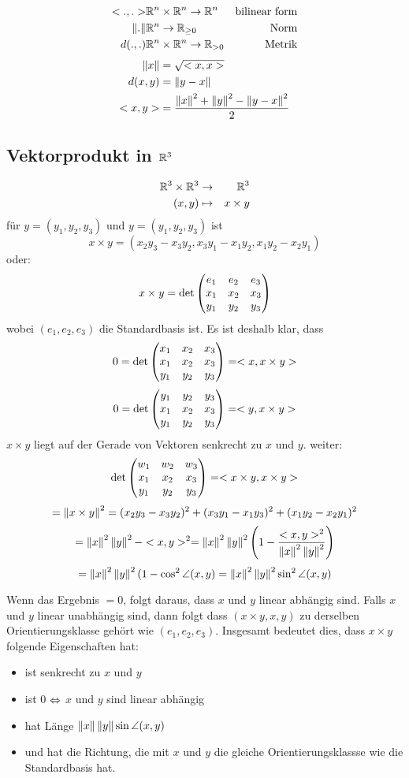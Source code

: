 \begin{Faz}
  \begin{align*}
    <.,.>& \mathbb{R}^n\times\mathbb{R}^n\to\mathbb{R}^n&\text{bilinear form}\\
    \left\| . \right\|& \mathbb{R}^n\to \mathbb{R}_{\geq 0}& \text{Norm}\\
    d(.,.)&\mathbb{R}^n\times\mathbb{R}^n\to\mathbb{R}_{>0}&\text{Metrik}
  \end{align*}
  \begin{align*}
    \left\| x \right\|&=\sqrt{<x,x>}\\
    d(x,y)&=\left\| y-x \right\|\\
    <x,y>&=\frac{\left\| x \right\|^2+\left\| y \right\|^2-\left\| y-x \right\|^2}{2}
  \end{align*}
\end{Faz}
\subsection{Vektorprodukt in $\mathbb{R}^3$}
  \begin{align*}
    \mathbb{R}^3\times\mathbb{R}^3&\to&\mathbb{R}^3\\
    (x,y)&\mapsto&x\times y
  \end{align*}
  für $y=(y_1,y_2,y_3)$ und $y=(y_1,y_2,y_3)$ ist 
  \[x\times y=(x_2y_3-x_3y_2, x_3y_1-x_1y_2,x_1y_2-x_2y_1)\]
  oder:
  \[x\times y=\det\begin{pmatrix}e_1&e_2&e_3\\x_1&x_2&x_3\\y_1&y_2&y_3\end{pmatrix}\]
  wobei $(e_1,e_2,e_3)$ die Standardbasis ist. Es ist deshalb klar, dass
  \[0=\det\begin{pmatrix}x_1&x_2&x_3\\x_1&x_2&x_3\\y_1&y_2&y_3\end{pmatrix}=<x,x\times y>\]
  \[0=\det\begin{pmatrix}y_1&y_2&y_3\\x_1&x_2&x_3\\y_1&y_2&y_3\end{pmatrix}=<y,x\times y>\]
  $x\times y$ liegt auf der Gerade von Vektoren senkrecht zu $x$ und $y$.
  weiter:
  \[\det\begin{pmatrix}w_1&w_2&w_3\\x_1&x_2&x_3\\y_1&y_2&y_3\end{pmatrix}=<x\times y,x\times y>\]
  \[=\left\| x\times y \right\|^2=(x_2y_3-x_3y_2)^2+(x_3y_1-x_1y_3)^2+(x_1y_2-x_2y_1)^2\]
  \[=\left\| x \right\|^2\left\| y \right\|^2-<x,y>^2=\left\| x \right\|^2\left\| y \right\|^2\left( 1-\frac{<x,y>^2}{\left\| x \right\|^2\left\| y \right\|^2} \right)\]
  \[=\left\| x \right\|^2\left\| y \right\|^2(1-\cos^2\angle (x,y) = \left\| x \right\|^2\left\| y \right\|^2\sin^2\angle (x,y)\]
\begin{Faz}
  Wenn das Ergebnis $=0$, folgt daraus, dass $x$ und $y$ linear abhängig sind. Falls $x$ und $y$ linear unabhängig sind, dann folgt dass $(x\times y,x,y)$ zu derselben Orientierungsklasse gehört wie $(e_1,e_2,e_3)$. Insgesamt bedeutet dies, dass $x\times y$ folgende Eigenschaften hat:
  \begin{itemize}
    \item ist senkrecht zu $x$ und $y$
    \item ist 0 $\Leftrightarrow$ $x$ und $y$ sind linear abhängig
    \item hat Länge $\left\| x \right\|\left\| y \right\|\sin \angle (x,y)$
    \item und hat die Richtung, die mit $x$ und $y$ die gleiche Orientierungsklassse wie die Standardbasis hat.
  \end{itemize}
\end{Faz}
